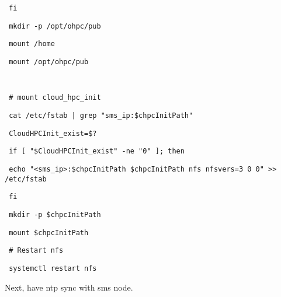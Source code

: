 \documentclass[12pt]{article}
\begin{document}
\begin{bash}\texttt{\small{ fi}}\end{bash}
\begin{bash}\texttt{\small{ mkdir -p /opt/ohpc/pub}}\end{bash}
\begin{bash}\texttt{\small{ mount /home}}\end{bash}
\begin{bash}\texttt{\small{ mount /opt/ohpc/pub}}\end{bash}
\begin{bash}\texttt{\small{ }}\end{bash}
\begin{bash}\texttt{\small{ \# mount cloud\_hpc\_init}}\end{bash}
\begin{bash}\texttt{\small{ cat /etc/fstab | grep "sms\_ip:\$chpcInitPath"}}\end{bash}
\begin{bash}\texttt{\small{ CloudHPCInit\_exist=\$?}}\end{bash}
\begin{bash}\texttt{\small{ if [ "\${CloudHPCInit\_exist}" -ne "0" ]; then}}\end{bash}
\begin{bash}\texttt{\small{     echo "<sms\_ip>:\$chpcInitPath \$chpcInitPath nfs nfsvers=3 0 0" >> /etc/fstab}}\end{bash}
\begin{bash}\texttt{\small{ fi}}\end{bash}
\begin{bash}\texttt{\small{ mkdir -p \$chpcInitPath}}\end{bash}
\begin{bash}\texttt{\small{ mount \$chpcInitPath}}\end{bash}
\begin{bash}\texttt{\small{ \# Restart nfs}}\end{bash}
\begin{bash}\texttt{\small{ systemctl restart nfs}}\end{bash}

Next, have ntp sync with sms node. 
\end{document}
